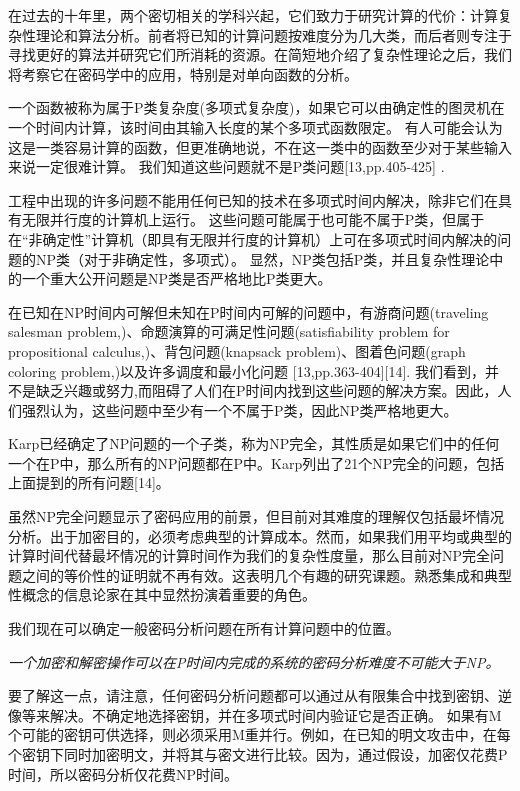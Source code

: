 \documentclass[]{article}
\begin{document}
	在过去的十年里，两个密切相关的学科兴起，它们致力于研究计算的代价：计算复杂性理论和算法分析。前者将已知的计算问题按难度分为几大类，而后者则专注于寻找更好的算法并研究它们所消耗的资源。在简短地介绍了复杂性理论之后，我们将考察它在密码学中的应用，特别是对单向函数的分析。
	
	
	一个函数被称为属于P类复杂度(多项式复杂度)，如果它可以由确定性的图灵机在一个时间内计算，该时间由其输入长度的某个多项式函数限定。
	有人可能会认为这是一类容易计算的函数，但更准确地说，不在这一类中的函数至少对于某些输入来说一定很难计算。
	我们知道这些问题就不是P类问题[13,pp.405-425] .
	
	工程中出现的许多问题不能用任何已知的技术在多项式时间内解决，除非它们在具有无限并行度的计算机上运行。
	这些问题可能属于也可能不属于P类，但属于在“非确定性”计算机（即具有无限并行度的计算机）上可在多项式时间内解决的问题的NP类（对于非确定性，多项式）。
	显然，NP类包括P类，并且复杂性理论中的一个重大公开问题是NP类是否严格地比P类更大。
	
	
	在已知在NP时间内可解但未知在P时间内可解的问题中，有游商问题(traveling salesman problem,)、命题演算的可满足性问题(satisfiability problem for propositional calculus,)、背包问题(knapsack problem)、图着色问题(graph coloring problem,)以及许多调度和最小化问题 [13,pp.363-404][14].
	我们看到，并不是缺乏兴趣或努力,而阻碍了人们在P时间内找到这些问题的解决方案。因此，人们强烈认为，这些问题中至少有一个不属于P类，因此NP类严格地更大。
	
	
	Karp已经确定了NP问题的一个子类，称为NP完全，其性质是如果它们中的任何一个在P中，那么所有的NP问题都在P中。Karp列出了21个NP完全的问题，包括上面提到的所有问题[14]。
	
	虽然NP完全问题显示了密码应用的前景，但目前对其难度的理解仅包括最坏情况分析。出于加密目的，必须考虑典型的计算成本。然而，如果我们用平均或典型的计算时间代替最坏情况的计算时间作为我们的复杂性度量，那么目前对NP完全问题之间的等价性的证明就不再有效。这表明几个有趣的研究课题。熟悉集成和典型性概念的信息论家在其中显然扮演着重要的角色。
	
	我们现在可以确定一般密码分析问题在所有计算问题中的位置。
	
	\textit{一个加密和解密操作可以在P时间内完成的系统的密码分析难度不可能大于NP。}
	
	要了解这一点，请注意，任何密码分析问题都可以通过从有限集合中找到密钥、逆像等来解决。不确定地选择密钥，并在多项式时间内验证它是否正确。
	如果有M个可能的密钥可供选择，则必须采用M重并行。例如，在已知的明文攻击中，在每个密钥下同时加密明文，并将其与密文进行比较。因为，通过假设，加密仅花费P时间，所以密码分析仅花费NP时间。
	
\end{document}
